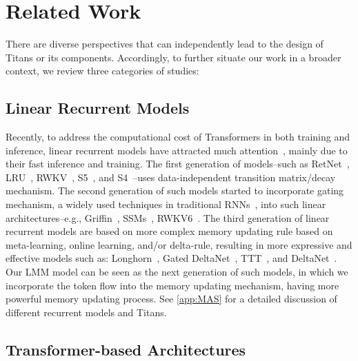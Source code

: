 \newpage
\section{Related Work}\label{app:rw}
There are diverse perspectives that can independently lead to the design of Titans or its components. Accordingly, to further situate our work in a broader context, we review three categories of studies:

\subsection{Linear Recurrent Models}
Recently, to address the computational cost of Transformers in both training and inference, linear recurrent models have attracted much attention~\citep{tiezzi2024resurgence}, mainly due to their fast inference and training. The first generation of models–such as RetNet~\citep{sun2023retentive}, LRU~\citep{orvieto2023resurrecting}, RWKV~\citep{peng2023rwkv}, S5~\citep{smith2023simplified}, and S4~\citep{gu2022efficiently}–uses data-independent transition matrix/decay mechanism. The second generation of such models started to incorporate gating mechanism, a widely used techniques in traditional RNNs~\citep{gers2000learning, greff2016lstm, van2018unreasonable}, into such linear architectures–e.g., Griffin~\citep{de2024griffin}, SSMs~\citep{hasani2023liquid, behrouz2024mambamixer, dao2024transformers, gu2024mamba}, RWKV6~\citep{peng2024eagle}. The third generation of linear recurrent models are based on more complex memory updating rule based on meta-learning, online learning, and/or delta-rule, resulting in more expressive and effective models such as: Longhorn~\citep{liu2024longhorn}, Gated DeltaNet~\citep{yang2024gated}, TTT~\citep{sun2024learning}, and DeltaNet~\citep{yang2024parallelizing}. Our LMM model can be seen as the next generation of such models, in which we incorporate the token flow into the memory updating mechanism, having more powerful memory updating process. See \autoref{app:MAS} for a detailed discussion of different recurrent models and Titans.




\subsection{Transformer-based Architectures}

